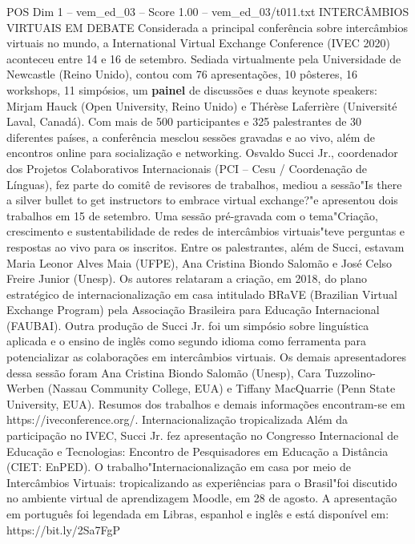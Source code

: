 \begin{textsample}{POS Dim 1 – vem\_ed\_03 – Score 1.00 – vem\_ed\_03/t011.txt}  \label{ex:f1_pos_031}
INTERCÂMBIOS VIRTUAIS EM DEBATE Considerada a principal conferência sobre intercâmbios virtuais no mundo, a International Virtual Exchange Conference (IVEC 2020) aconteceu entre 14 e 16 de setembro.
Sediada virtualmente pela Universidade de Newcastle (Reino Unido), contou com 76 apresentações, 10 pôsteres, 16 workshops, 11 simpósios, um \textbf{painel} de discussões e duas keynote speakers: Mirjam Hauck (Open University, Reino Unido) e Thérèse Laferrière (Université Laval, Canadá).
Com mais de 500 participantes e 325 palestrantes de 30 diferentes países, a conferência mesclou sessões gravadas e ao vivo, além de encontros online para socialização e networking.
Osvaldo Succi Jr., coordenador dos Projetos Colaborativos Internacionais (PCI – Cesu / Coordenação de Línguas), fez parte do comitê de revisores de trabalhos, mediou a sessão"Is there a silver bullet to get instructors to embrace virtual exchange?"e apresentou dois trabalhos em 15 de setembro.
Uma sessão pré-gravada com o tema"Criação, crescimento e sustentabilidade de redes de intercâmbios virtuais"teve perguntas e respostas ao vivo para os inscritos.
Entre os palestrantes, além de Succi, estavam Maria Leonor Alves Maia (UFPE), Ana Cristina Biondo Salomão e José Celso Freire Junior (Unesp).
Os autores relataram a criação, em 2018, do plano estratégico de internacionalização em casa intitulado BRaVE (Brazilian Virtual Exchange Program) pela Associação Brasileira para Educação Internacional (FAUBAI).
Outra produção de Succi Jr. foi um simpósio sobre linguística aplicada e o ensino de inglês como segundo idioma como ferramenta para potencializar as colaborações em intercâmbios virtuais.
Os demais apresentadores dessa sessão foram Ana Cristina Biondo Salomão (Unesp), Cara Tuzzolino-Werben (Nassau Community College, EUA) e Tiffany MacQuarrie (Penn State University, EUA).
Resumos dos trabalhos e demais informações encontram-se em https://iveconference.org/.
Internacionalização tropicalizada Além da participação no IVEC, Succi Jr. fez apresentação no Congresso Internacional de Educação e Tecnologias: Encontro de Pesquisadores em Educação a Distância (CIET: EnPED).
O trabalho"Internacionalização em casa por meio de Intercâmbios Virtuais: tropicalizando as experiências para o Brasil"foi discutido no ambiente virtual de aprendizagem Moodle, em 28 de agosto.
A apresentação em português foi legendada em Libras, espanhol e inglês e está disponível em: https://bit.ly/2Sa7FgP

\end{textsample}
